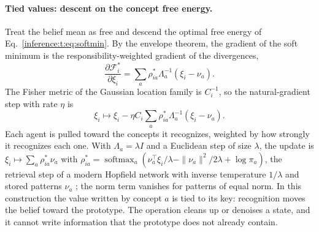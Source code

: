 \documentclass[11pt]{article}
\theoremstyle{definition}
\theoremstyle{remark}
\providecommand{\softmax}{\operatorname{softmax}}
\providecommand{\F}{\mathcal{F}}
\begin{document}
\paragraph{Tied values: descent on the concept free energy.}
Treat the belief mean as free and descend the optimal free energy of Eq.~\eqref{inference:t:eq:softmin}. By the envelope theorem, the gradient of the soft minimum is the responsibility-weighted gradient of the divergences,
\begin{equation}
\frac{\partial\F_i^{*}}{\partial\xi_i}=\sum_a\rho^{*}_{ia}\Lambda_a^{-1}(\xi_i-\nu_a).
\end{equation}
The Fisher metric of the Gaussian location family is $C_i^{-1}$, so the natural-gradient step with rate $\eta$ is
\begin{equation}
\xi_i\mapsto\xi_i-\eta C_i\sum_a\rho^{*}_{ia}\Lambda_a^{-1}(\xi_i-\nu_a).
\label{inference:t:eq:tied_update}
\end{equation}
Each agent is pulled toward the concepts it recognizes, weighted by how strongly it recognizes each one. With $\Lambda_a=\lambda I$ and a Euclidean step of size $\lambda$, the update is $\xi_i\mapsto\sum_a\rho^{*}_{ia}\nu_a$ with $\rho^{*}_{ia}=\softmax_a(\nu_a^{\top}\xi_i/\lambda-\|\nu_a\|^2/2\lambda+\log\pi_a)$, the retrieval step of a modern Hopfield network with inverse temperature $1/\lambda$ and stored patterns $\nu_a$ \citep{inference:ramsauer2021}; the norm term vanishes for patterns of equal norm. In this construction the value written by concept $a$ is tied to its key: recognition moves the belief toward the prototype. The operation cleans up or denoises a state, and it cannot write information that the prototype does not already contain.
\end{document}
